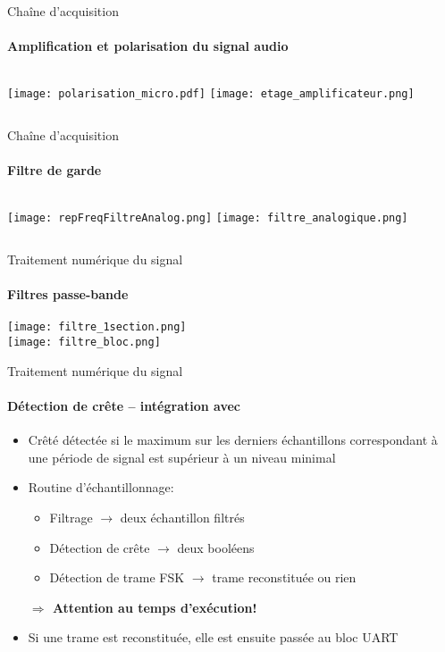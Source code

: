 \begin{frame}
  \tableofcontents[currentsection]
\end{frame}

\begin{frame}{Chaîne d'acquisition}
  \framesubtitle{Amplification et polarisation du signal audio}
  \begin{columns}[c]
  \vspace{4.5cm}
  \texttt{[image: polarisation\_micro.pdf]}
  \texttt{[image: etage\_amplificateur.png]}
  \end{columns}
\end{frame}

\begin{frame}{Chaîne d'acquisition}
  \framesubtitle{Filtre de garde}
  \begin{columns}[c]
  \texttt{[image: repFreqFiltreAnalog.png]}
  \texttt{[image: filtre\_analogique.png]}
  \end{columns}
\end{frame}

\begin{frame}{Traitement numérique du signal}
  \framesubtitle{Filtres passe-bande}
  \begin{center}
  \texttt{[image: filtre\_1section.png]}\\
  \texttt{[image: filtre\_bloc.png]}
  \end{center}
\end{frame}

\begin{frame}{Traitement numérique du signal}
  \framesubtitle{Détection de crête -- intégration avec }
  \begin{itemize}
    \item Crêté détectée si le maximum sur les derniers échantillons correspondant à une période de signal est supérieur à un niveau minimal
    \item Routine d'échantillonnage:
    \begin{itemize}
      \item Filtrage $\rightarrow$ deux échantillon filtrés
      \item Détection de crête $\rightarrow$ deux booléens
      \item Détection de trame FSK $\rightarrow$ trame reconstituée ou rien
    \end{itemize}
    \textbf{\large $\Rightarrow$ Attention au temps d'exécution!}
    \item Si une trame est reconstituée, elle est ensuite passée au bloc UART
  \end{itemize}
\end{frame}



